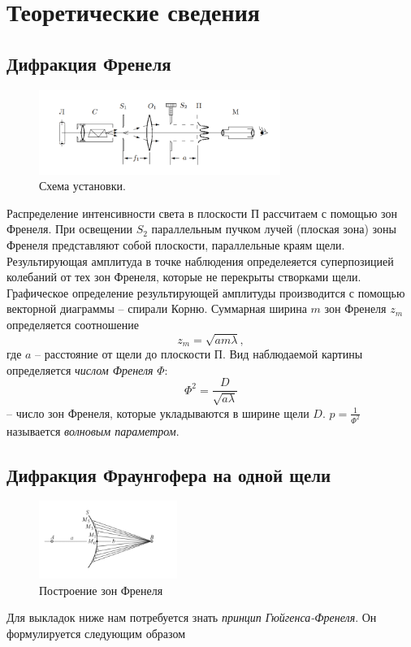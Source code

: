 \documentclass[a4paper, 12pt]{article}%
\begin{document}
\section{Теоретические сведения}
\subsection*{Дифракция Френеля}
\begin{figure}[h]
\includegraphics[width=0.7\textwidth]{pics/1.png}
\centering
\caption{Схема установки.}
\end{figure}
Распределение интенсивности света в плоскости П рассчитаем с помощью зон Френеля. При освещении $S_2$ параллельным пучком лучей (плоская зона) зоны Френеля представляют собой плоскости, параллельные краям щели. Результирующая амплитуда в точке наблюдения определеяется суперпозицией колебаний от тех зон Френеля, которые не перекрыты створками щели. Графическое определение результирующей амплитуды производится с помощью векторной диаграммы -- спирали Корню. Суммарная ширина $m$ зон Френеля $z_m$ определяется соотношение
\begin{equation}
z_m = \sqrt{am\lambda},
\end{equation}
где $a$ -- расстояние от щели до плоскости П. Вид наблюдаемой картины определяется \textit{числом Френеля} $\Phi$:
$$
\Phi^2 = \dfrac{D}{\sqrt{a\lambda}}
$$
-- число зон Френеля, которые укладываются в ширине щели $D$. $p = \frac{1}{\Phi^2}$ называется \textit{волновым параметром}. 

\newpage

\subsection*{Дифракция Фраунгофера на одной щели}

\begin{figure}
  \begin{center}
    \includegraphics[width = 0.4\textwidth]{pics/2.png}
  \end{center}
  \caption{Построение зон Френеля}
\end{figure}
Для выкладок ниже нам потребуется знать \textit{принцип Гюйгенса-Френеля}. Он формулируется следующим образом 
\end{document}
